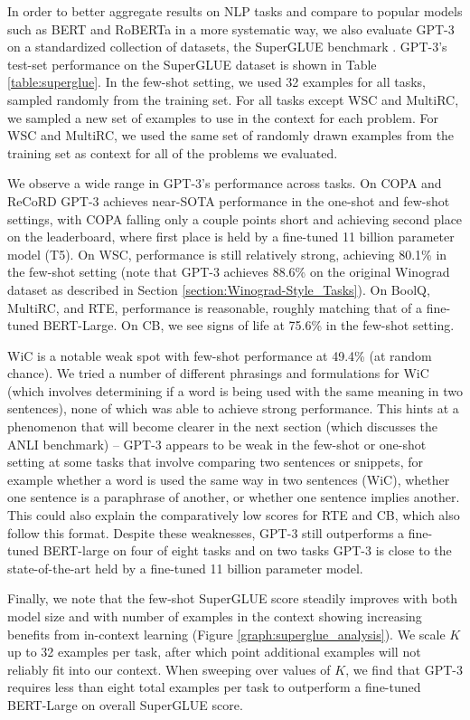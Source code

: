 In order to better aggregate results on NLP tasks and compare to popular models such as BERT and RoBERTa in a more systematic way, we also evaluate GPT-3 on a standardized collection of datasets, the SuperGLUE benchmark \cite{wang2019superglue} \citep{wang2019superglue} \citep{clark2019boolq} \citep{demarneffe:cb} \citep{roemmele2011choice} \citep{khashabi2018looking} \citep{zhang2018record} \citep{dagan2006pascal} \citep{bar2006second} \citep{giampiccolo2007third} \citep{bentivogli2009fifth} \citep{pilehvar2018wic} \citep{poliak2018dnc}. GPT-3’s test-set performance on the SuperGLUE dataset is shown in Table \ref{table:superglue}.  In the few-shot setting, we used 32 examples for all tasks, sampled randomly from the training set. For all tasks except WSC and MultiRC, we sampled a new set of examples to use in the context for each problem. For WSC and MultiRC, we used the same set of randomly drawn examples from the training set as context for all of the problems we evaluated.

We observe a wide range in GPT-3’s performance across tasks.  On COPA and ReCoRD GPT-3 achieves near-SOTA performance in the one-shot and few-shot settings, with COPA falling only a couple points short and achieving second place on the leaderboard, where first place is held by a fine-tuned 11 billion parameter model (T5). On WSC, performance is still relatively strong, achieving 80.1\% in the few-shot setting (note that GPT-3 achieves 88.6\% on the original Winograd dataset as described in Section \ref{section:Winograd-Style_Tasks}).  On BoolQ, MultiRC, and RTE, performance is reasonable, roughly matching that of a fine-tuned BERT-Large. On CB, we see signs of life at 75.6\% in the few-shot setting.

WiC is a notable weak spot with few-shot performance at 49.4\% (at random chance).  We tried a number of different phrasings and formulations for WiC (which involves determining if a word is being used with the same meaning in two sentences), none of which was able to achieve strong performance.  This hints at a phenomenon that will become clearer in the next section (which discusses the ANLI benchmark) -- GPT-3 appears to be weak in the few-shot or one-shot setting at some tasks that involve comparing two sentences or snippets, for example whether a word is used the same way in two sentences (WiC), whether one sentence is a paraphrase of another, or whether one sentence implies another. This could also explain the comparatively low scores for RTE and CB, which also follow this format. Despite these weaknesses, GPT-3 still outperforms a fine-tuned BERT-large on four of eight tasks and on two tasks GPT-3 is close to the state-of-the-art held by a fine-tuned 11 billion parameter model.

Finally, we note that the few-shot SuperGLUE score steadily improves with both model size and with number of examples in the context showing increasing benefits from in-context learning (Figure \ref{graph:superglue_analysis}). We scale $K$ up to 32 examples per task, after which point additional examples will not reliably fit into our context. When sweeping over values of $K$, we find that GPT-3 requires less than eight total examples per task to outperform a fine-tuned BERT-Large on overall SuperGLUE score.

